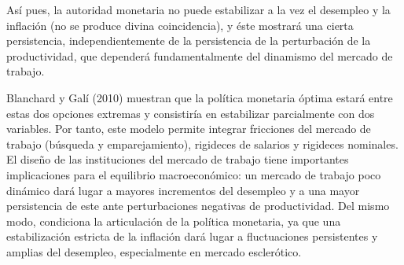 \documentclass[10pt,a4paper]{article}
\begin{document}
{Así pues, la autoridad monetaria no puede estabilizar a la vez el desempleo y la inflación (no se produce divina coincidencia), y éste mostrará una cierta persistencia, independientemente de la persistencia de la perturbación de la productividad, que dependerá fundamentalmente del dinamismo del mercado de trabajo.

Blanchard y Galí (2010) muestran que la política monetaria óptima estará entre estas dos opciones extremas y consistiría en estabilizar parcialmente con dos variables. Por tanto, este modelo permite integrar fricciones del mercado de trabajo (búsqueda y emparejamiento), rigideces de salarios y rigideces nominales. El diseño de las instituciones del mercado de trabajo tiene importantes implicaciones para el equilibrio macroeconómico: un mercado de trabajo poco dinámico dará lugar a mayores incrementos del desempleo y a una mayor persistencia de este ante perturbaciones negativas de productividad. Del mismo modo, condiciona la articulación de la política monetaria, ya que una estabilización estricta de la inflación dará lugar a fluctuaciones persistentes y amplias del desempleo, especialmente en mercado esclerótico.

}
\end{document}
